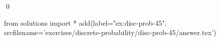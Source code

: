 
\begin{ex} 
  \label{ex:disc-prob-45}
  
  \qed
\end{ex} 
\begin{python0}
from solutions import *
add(label="ex:disc-prob-45",
    srcfilename='exercises/discrete-probability/disc-prob-45/answer.tex') 
\end{python0}
